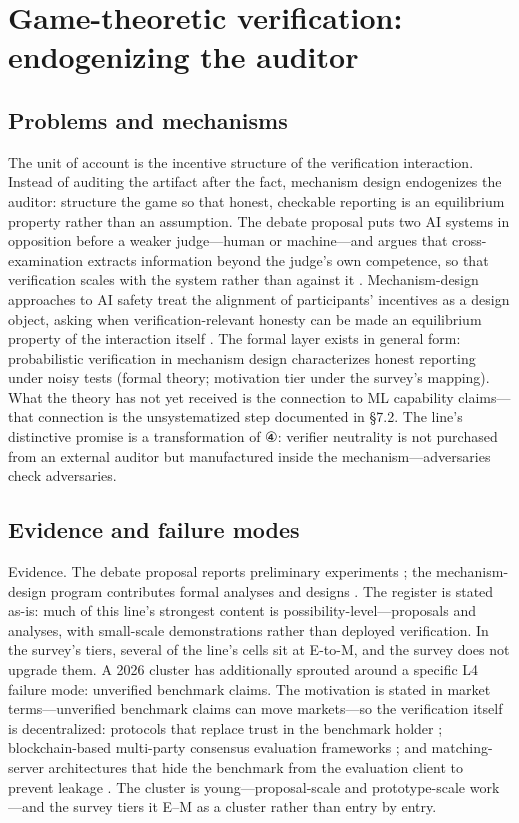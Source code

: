 \documentclass[11pt,a4paper]{article}
\begin{document}
\section{Game-theoretic verification: endogenizing the auditor}

\subsection{Problems and mechanisms}

The unit of account is the incentive structure of the verification interaction. Instead of auditing the artifact after the fact, mechanism design endogenizes the auditor: structure the game so that honest, checkable reporting is an equilibrium property rather than an assumption. The debate proposal puts two AI systems in opposition before a weaker judge—human or machine—and argues that cross-examination extracts information beyond the judge's own competence, so that verification scales with the system rather than against it \cite{key09}. Mechanism-design approaches to AI safety treat the alignment of participants' incentives as a design object, asking when verification-relevant honesty can be made an equilibrium property of the interaction itself \cite{key10}. The formal layer exists in general form: probabilistic verification in mechanism design characterizes honest reporting under noisy tests \cite{key38} (formal theory; motivation tier under the survey's mapping). What the theory has not yet received is the connection to ML capability claims—that connection is the unsystematized step documented in §7.2. The line's distinctive promise is a transformation of ④: verifier neutrality is not purchased from an external auditor but manufactured inside the mechanism—adversaries check adversaries.

\subsection{Evidence and failure modes}

Evidence. The debate proposal reports preliminary experiments \cite{key09}; the mechanism-design program contributes formal analyses and designs \cite{key10}. The register is stated as-is: much of this line's strongest content is possibility-level—proposals and analyses, with small-scale demonstrations rather than deployed verification. In the survey's tiers, several of the line's cells sit at E-to-M, and the survey does not upgrade them. A 2026 cluster has additionally sprouted around a specific L4 failure mode: unverified benchmark claims. The motivation is stated in market terms—unverified benchmark claims can move markets—so the verification itself is decentralized: protocols that replace trust in the benchmark holder \cite{key39}; blockchain-based multi-party consensus evaluation frameworks \cite{key40}; and matching-server architectures that hide the benchmark from the evaluation client to prevent leakage \cite{key41}. The cluster is young—proposal-scale and prototype-scale work—and the survey tiers it E–M as a cluster rather than entry by entry.
\end{document}

